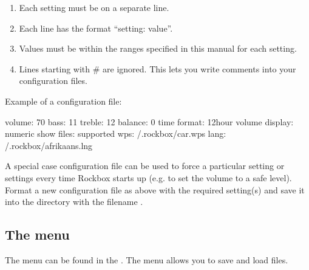 \begin{enumerate}
\item Each setting must be on a separate line.
\item Each line has the format ``setting: value''.
\item Values must be within the ranges specified in this manual for each
  setting.
\item Lines starting with \# are ignored. This lets you write comments into
  your configuration files.
\end{enumerate}

Example of a configuration file:
\begin{example}
    volume: 70
    bass: 11
    treble: 12
    balance: 0
    time format: 12hour
    volume display: numeric
    show files: supported
    wps: /.rockbox/car.wps
    lang: /.rockbox/afrikaans.lng
\end{example}


  A special case configuration file can be used to force a particular setting
  or settings every time Rockbox starts up (e.g. to set the volume to a safe
  level). Format a new configuration file as above with the required setting(s)
  and save it into the  directory with the filename
  .

\subsection{\label{ref:manage_settings_menu}The 
  menu} The  menu can be found in the . The  menu allows you to save and load
   files.

